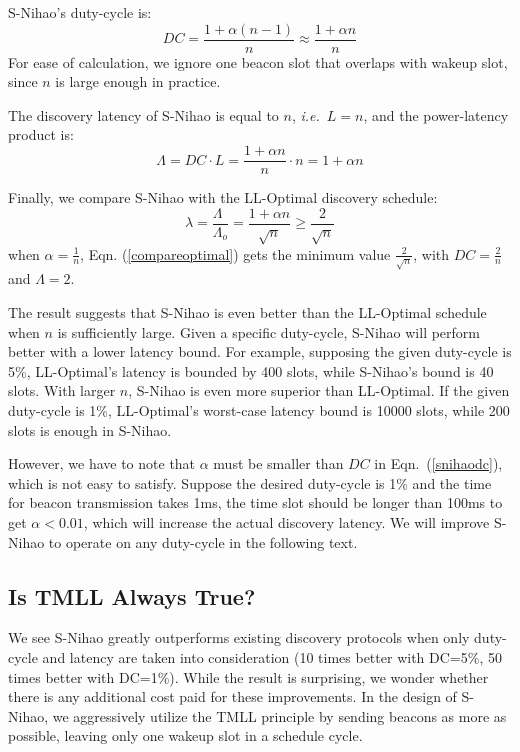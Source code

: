 \documentclass[conference]{IEEEtran}
\begin{document}
S-Nihao's duty-cycle is:
\begin{equation} \label{snihaodc}
    DC = \frac{1 + \alpha (n-1)}{n} \approx \frac{1+ \alpha n}{n}
\end{equation}
For ease of calculation, we ignore one beacon slot that overlaps with wakeup slot, since $n$ is large enough in practice.

The discovery latency of S-Nihao is equal to $n$, \emph{i.e.}\ $L = n$, and the power-latency product is:
\begin{displaymath}
    \Lambda = DC \cdot L = \frac{1+\alpha n}{n} \cdot n = 1 + \alpha n
\end{displaymath}

Finally, we compare S-Nihao with the LL-Optimal discovery schedule:
\begin{equation} \label{compareoptimal}
    \lambda = \frac{\Lambda_{\phantom{1}}}{\Lambda_o} = \frac{1+ \alpha n}{\sqrt{n}} \geq \frac{2}{\sqrt{n}}
\end{equation}
when $\alpha=\frac{1}{n}$, Eqn. (\ref{compareoptimal}) gets the minimum value $\frac{2}{\sqrt{n}}$,
with $DC=\frac{2}{n}$ and $\Lambda=2$.

The result suggests that S-Nihao is even better than the LL-Optimal schedule when $n$ is sufficiently large.
Given a specific duty-cycle, S-Nihao will perform better with a lower latency bound.
For example, supposing the given duty-cycle is 5\%, LL-Optimal's latency is bounded by 400 slots, while S-Nihao's bound is 40 slots.
With larger $n$, S-Nihao is even more superior than LL-Optimal.
If the given duty-cycle is 1\%, LL-Optimal's worst-case latency bound is 10000 slots,
while 200 slots is enough in S-Nihao.

However, we have to note that $\alpha$ must be smaller than $DC$ in Eqn.~(\ref{snihaodc}), which is not easy to satisfy.
Suppose the desired duty-cycle is 1\% and the time for beacon transmission takes 1ms,
the time slot should be longer than 100ms to get $\alpha < 0.01$, which will increase the actual discovery latency.
We will improve S-Nihao to operate on any duty-cycle in the following text.

\subsection{Is TMLL Always True?}
We see S-Nihao greatly outperforms existing discovery protocols when only duty-cycle and latency are taken into consideration
(10 times better with DC=5\%, 50 times better with DC=1\%).
While the result is surprising, we wonder whether there is any additional cost paid for these improvements.
In the design of S-Nihao, we aggressively utilize the TMLL principle by sending beacons as more as possible, leaving only one wakeup slot in a schedule cycle.
\end{document}
